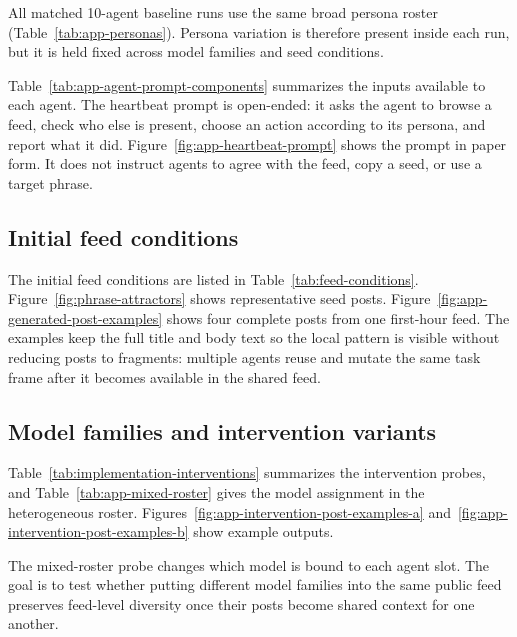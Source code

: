 All matched 10-agent baseline runs use the same broad persona roster (Table~\ref{tab:app-personas}). Persona variation is therefore present inside each run, but it is held fixed across model families and seed conditions.

Table~\ref{tab:app-agent-prompt-components} summarizes the inputs available to each agent. The heartbeat prompt is open-ended: it asks the agent to browse a feed, check who else is present, choose an action according to its persona, and report what it did. Figure~\ref{fig:app-heartbeat-prompt} shows the prompt in paper form. It does not instruct agents to agree with the feed, copy a seed, or use a target phrase.

\subsection{Initial feed conditions}
\label{app:seed-conditions}

The initial feed conditions are listed in Table~\ref{tab:feed-conditions}. Figure~\ref{fig:phrase-attractors} shows representative seed posts. Figure~\ref{fig:app-generated-post-examples} shows four complete posts from one first-hour feed. The examples keep the full title and body text so the local pattern is visible without reducing posts to fragments: multiple agents reuse and mutate the same task frame after it becomes available in the shared feed.

\subsection{Model families and intervention variants}
\label{app:intervention-details}

Table~\ref{tab:implementation-interventions} summarizes the intervention probes, and Table~\ref{tab:app-mixed-roster} gives the model assignment in the heterogeneous roster. Figures~\ref{fig:app-intervention-post-examples-a} and~\ref{fig:app-intervention-post-examples-b} show example outputs.

The mixed-roster probe changes which model is bound to each agent slot. The goal is to test whether putting different model families into the same public feed preserves feed-level diversity once their posts become shared context for one another.

